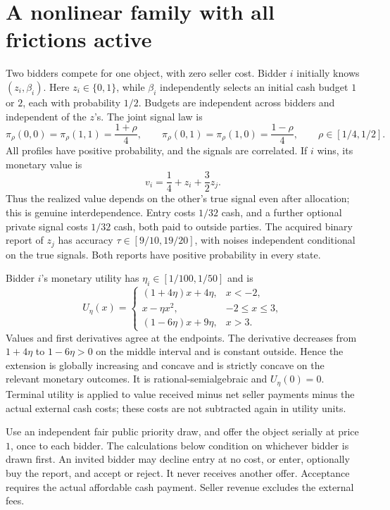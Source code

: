 \documentclass[11pt,a4paper]{article}
\numberwithin{equation}{section}
\theoremstyle{definition}
\begin{document}
\section{A nonlinear family with all frictions active}\label{sec:example}
Two bidders compete for one object, with zero seller cost.
Bidder \(i\) initially knows \((z_i,\beta_i)\).
Here \(z_i\in\{0,1\}\), while \(\beta_i\) independently selects an
initial cash budget \(1\) or \(2\), each with probability \(1/2\).
Budgets are independent across bidders and independent of the \(z\)'s.
The joint signal law is
\[
 \pi_\rho(0,0)=\pi_\rho(1,1)=\frac{1+\rho}{4},\qquad
 \pi_\rho(0,1)=\pi_\rho(1,0)=\frac{1-\rho}{4},
 \qquad \rho\in[1/4,1/2].
\]
All profiles have positive probability, and the signals are correlated.
If \(i\) wins, its monetary value is
\[
 v_i=\frac14+z_i+\frac32z_j.
\]
Thus the realized value depends on the other's true signal even after
allocation; this is genuine interdependence.
Entry costs \(1/32\) cash, and a further optional private signal costs
\(1/32\) cash, both paid to outside parties.
The acquired binary report of \(z_j\) has accuracy
\(\tau\in[9/10,19/20]\), with noises independent conditional on the
true signals. Both reports have positive probability in every state.

Bidder \(i\)'s monetary utility has
\(\eta_i\in[1/100,1/50]\) and is
\begin{equation}\label{eq:utilityexample}
 U_\eta(x)=
 \begin{cases}
  (1+4\eta)x+4\eta,&x<-2,\\
  x-\eta x^2,&-2\le x\le3,\\
  (1-6\eta)x+9\eta,&x>3.
 \end{cases}
\end{equation}
Values and first derivatives agree at the endpoints.
The derivative decreases from \(1+4\eta\) to \(1-6\eta>0\) on
the middle interval and is constant outside.
Hence the extension is globally increasing and concave and is
strictly concave on the relevant monetary outcomes.
It is rational-semialgebraic and \(U_\eta(0)=0\).
Terminal utility is applied to value received minus net seller payments
minus the actual external cash costs; these costs are not subtracted
again in utility units.

Use an independent fair public priority draw, and offer the object
serially at price \(1\), once to each bidder.
The calculations below condition on whichever bidder is drawn first.
An invited bidder may decline entry at no cost, or enter, optionally
buy the report, and accept or reject.
It never receives another offer.
Acceptance requires the actual affordable cash payment.
Seller revenue excludes the external fees.
\end{document}
